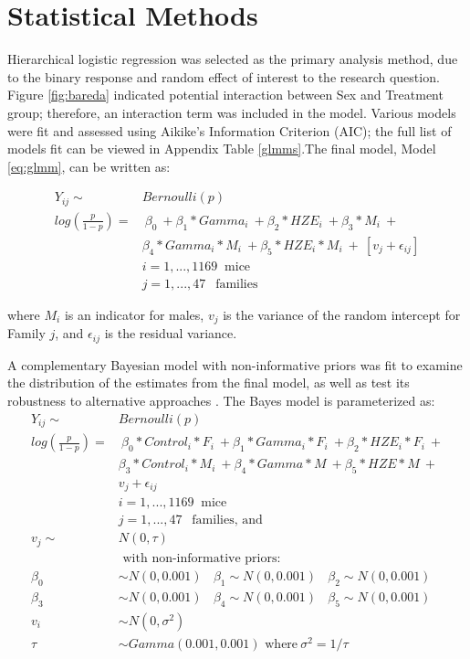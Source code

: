 \documentclass[12pt]{article}
\begin{document}
\section{Statistical Methods}
\label{sec:methods}

Hierarchical logistic regression was selected as the primary analysis method, due to the binary response and random effect of interest to the research question. Figure \ref{fig:bareda} indicated potential interaction between Sex and Treatment group; therefore, an interaction term was included in the model. Various models were fit and assessed using Aikike's Information Criterion (AIC); the full list of models fit can be viewed in Appendix Table \ref{glmms}.The final model, Model \eqref{eq:glmm}, can be written as:

\begin{equation}
\begin{aligned}
Y_{ij} \sim &Bernoulli(p) \\
log(\frac{p}{1-p}) = &\ \beta_0\ +\beta_1*Gamma_i\ + \beta_2*HZE_i\ + \beta_3*M_i\ + \\ &\beta_4*Gamma_i*M_i\ + \beta_5*HZE_i*M_i\ +\ [v_{j} + \epsilon_{ij}] \\
&i = 1, ..., 1169\ \mbox{ mice} \\
&j = 1,...,47\ \ \mbox{ families}
\end{aligned}
\label{eq:glmm}
\end{equation}

where \(M_i\) is an indicator for males, \(v_{j}\) is the variance of the random intercept for Family \(j\), and \(\epsilon_{ij}\) is the residual variance.

A complementary Bayesian model with non-informative priors was fit to examine the distribution of the estimates from the final model, as well as test its robustness to alternative approaches \citep{BDA}. The Bayes model is parameterized as:\\
\begin{equation}
\begin{aligned}
Y_{ij} \sim &Bernoulli(p)\\
log(\frac{p}{1-p}) = &\ \beta_0*Control_i*F_i\ +\beta_1*Gamma_i*F_i\ + \beta_2*HZE_i*F_i\ + \\ &\beta_3*Control_i*M_i\ +\beta_4*Gamma*M\ + \beta_5*HZE*M\ + \\
&v_{j} + \epsilon_{ij}\\
&i = 1, ..., 1169\ \mbox{ mice} \\
&j = 1,...,47\ \ \mbox{ families, and} \\
v_j \sim\ &N(0, \tau)
\\
&\mbox{ with non-informative priors:}\\
\beta_0 &\sim N(0, 0.001)\ \ \ \ \beta_1 \sim N(0, 0.001)\ \ \ \ \beta_2 \sim N(0, 0.001)\\
\beta_3 &\sim N(0, 0.001)\ \ \ \ \beta_4 \sim N(0, 0.001)\ \ \ \ \beta_5 \sim N(0, 0.001)\\
v_i &\sim N(0, \sigma^2)\\
\tau &\sim Gamma(0.001, 0.001) \mbox{ where}\ \sigma^2 = 1/\tau 
\end{aligned}
\label{eq:bayes}
\end{equation}
\end{document}
